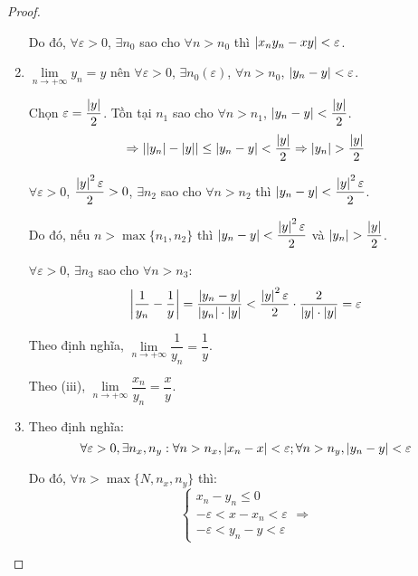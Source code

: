 \documentclass[class=analysis,crop=false]{standalone}
\begin{document}
\begin{proof}
\begin{enumerate}[label = (\roman*)]
              \par Do đó, $\forall\varepsilon > 0$, $\exists n_{0}$ sao cho $\forall n > n_{0}$ thì $\left\vert{x_{n}y_{n} - xy}\right\vert < \varepsilon$.
        \item $\lim\limits_{n\to+\infty}y_{n} = y$ nên $\forall\varepsilon > 0$, $\exists n_{0}(\varepsilon)$, $\forall n > n_{0}$, $\left\vert{y_{n} - y}\right\vert < \varepsilon$.
              \par Chọn $\varepsilon = \dfrac{\left\vert{y}\right\vert}{2}$. Tồn tại $n_{1}$ sao cho $\forall n > n_{1}$, $\left\vert{y_{n} - y}\right\vert < \dfrac{\left\vert{y}\right\vert}{2}$.
              \[
                  \Rightarrow \left\vert{\left\vert{y_{n}}\right\vert - \left\vert{y}\right\vert}\right\vert \le \left\vert{y_{n} - y}\right\vert < \frac{\left\vert{y}\right\vert}{2} \Rightarrow \left\vert{y_{n}}\right\vert > \frac{\left\vert{y}\right\vert}{2}
              \]
              \par $\forall\varepsilon > 0$, $\dfrac{\left\vert{y}\right\vert^{2}\varepsilon}{2} > 0$, $\exists n_{2}$ sao cho $\forall n > n_{2}$ thì $\left\vert{y_{n} - y}\right\vert < \dfrac{\left\vert{y}\right\vert^{2}\varepsilon}{2}$.
              \par Do đó, nếu $n > \max\{n_{1}, n_{2}\}$ thì $\left\vert{y_{n} - y}\right\vert < \dfrac{\left\vert{y}\right\vert^{2}\varepsilon}{2}$ và $\left\vert{y_{n}}\right\vert > \dfrac{\left\vert{y}\right\vert}{2}$.
              \par $\forall\varepsilon > 0$, $\exists n_{3}$ sao cho $\forall n > n_{3}$:
              \[
                  \left\vert{\frac{1}{y_{n}} - \frac{1}{y}}\right\vert = \frac{\left\vert{y_{n} - y}\right\vert}{\left\vert{y_{n}}\right\vert\cdot\left\vert{y}\right\vert} < \frac{\left\vert{y}\right\vert^{2}\varepsilon}{2}\cdot\frac{2}{\left\vert{y}\right\vert\cdot\left\vert{y}\right\vert} = \varepsilon
              \]
              \par Theo định nghĩa, $\lim\limits_{n\to+\infty}\dfrac{1}{y_{n}} = \dfrac{1}{y}$.
              \par Theo (iii), $\lim\limits_{n\to+\infty}\dfrac{x_{n}}{y_{n}} = \dfrac{x}{y}$.
        \item Theo định nghĩa:
              \[
                  \forall\varepsilon > 0, \exists n_{x}, n_{y}: \forall n > n_{x}, \left\vert{x_{n} - x}\right\vert < \varepsilon; \forall n > n_{y}, \left\vert{y_{n} - y}\right\vert < \varepsilon
              \]
              \par Do đó, $\forall n > \max\{ N, n_{x}, n_{y} \}$ thì:
              \[
                  \begin{cases}
                      x_{n} - y_{n} \le 0                    \\
                      -\varepsilon < x - x_{n} < \varepsilon \\
                      -\varepsilon < y_{n} - y < \varepsilon
                  \end{cases}
                  \Rightarrow
\]
\end{enumerate}
\end{proof}
\end{document}

